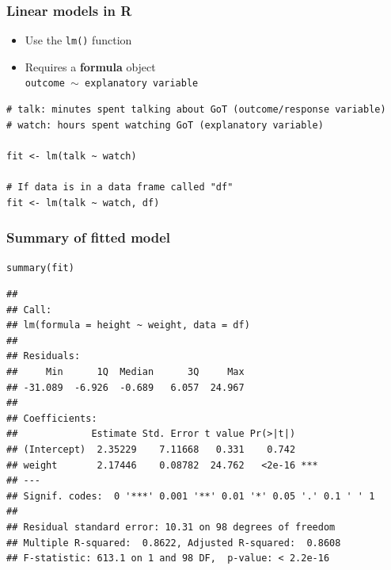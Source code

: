 \documentclass[pdf,handout]{beamer}
\begin{document}
\begin{frame}[fragile]
\frametitle{Linear models in R}

\begin{itemize}\addtolength{\itemsep}{0.5\baselineskip}
    \item Use the \texttt{lm()} function
    \item Requires a \textbf{formula} object\\ \texttt{outcome $\sim$ explanatory variable}
\end{itemize}

\vfill

\begin{lstlisting}[style=R]
# talk: minutes spent talking about GoT (outcome/response variable)
# watch: hours spent watching GoT (explanatory variable) 

fit <- lm(talk ~ watch)

# If data is in a data frame called "df"
fit <- lm(talk ~ watch, df) 
\end{lstlisting}

\end{frame}

\begin{frame}[fragile]
\frametitle{Summary of fitted model}

\begin{lstlisting}[style=R]
summary(fit)
\end{lstlisting}

\scriptsize
\begin{verbatim}
## 
## Call:
## lm(formula = height ~ weight, data = df)
## 
## Residuals:
##     Min      1Q  Median      3Q     Max 
## -31.089  -6.926  -0.689   6.057  24.967 
## 
## Coefficients:
##             Estimate Std. Error t value Pr(>|t|)    
## (Intercept)  2.35229    7.11668   0.331    0.742    
## weight       2.17446    0.08782  24.762   <2e-16 ***
## ---
## Signif. codes:  0 '***' 0.001 '**' 0.01 '*' 0.05 '.' 0.1 ' ' 1
## 
## Residual standard error: 10.31 on 98 degrees of freedom
## Multiple R-squared:  0.8622, Adjusted R-squared:  0.8608 
## F-statistic: 613.1 on 1 and 98 DF,  p-value: < 2.2e-16
\end{verbatim}
\normalsize

\end{frame}
\end{document}
